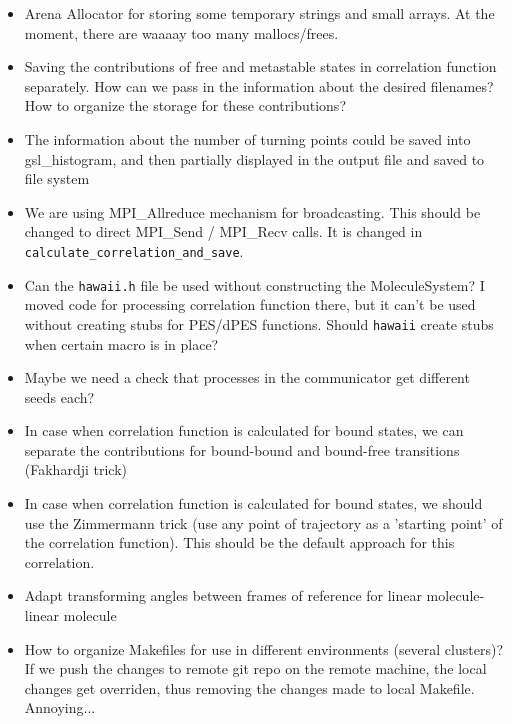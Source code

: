 \documentclass{article}
\begin{document}
\begin{itemize}
    \item Arena Allocator for storing some temporary strings and small arrays. At the moment, there are waaaay too many mallocs/frees. 
    \item Saving the contributions of free and metastable states in correlation function separately. How can we pass in the information about the desired filenames? How to organize the storage for these contributions? 
    \item The information about the number of turning points could be saved into gsl\_histogram, and then partially displayed in the output file and saved to file system
    \item We are using MPI\_Allreduce mechanism for broadcasting. This should be changed to direct MPI\_Send / MPI\_Recv calls. {\color{red} It is changed in \texttt{calculate\_correlation\_and\_save}.}
    \item Can the \texttt{hawaii.h} file be used without constructing the MoleculeSystem? I moved code for processing correlation function there, but it can't be used without creating stubs for PES/dPES functions. Should \texttt{hawaii} create stubs when certain macro is in place? 
    \item Maybe we need a check that processes in the communicator get different seeds each?
    \item In case when correlation function is calculated for bound states, we can separate the contributions for bound-bound and bound-free transitions (Fakhardji trick)
    \item In case when correlation function is calculated for bound states, we should use the Zimmermann trick (use any point of trajectory as a 'starting point' of the correlation function). This should be the default approach for this correlation. 
    \item Adapt transforming angles between frames of reference for linear molecule-linear molecule
    \item How to organize Makefiles for use in different environments (several clusters)? If we push the changes to remote git repo on the remote machine, the local changes get overriden, thus removing the changes made to local Makefile. Annoying... 

\end{itemize}
\end{document}
